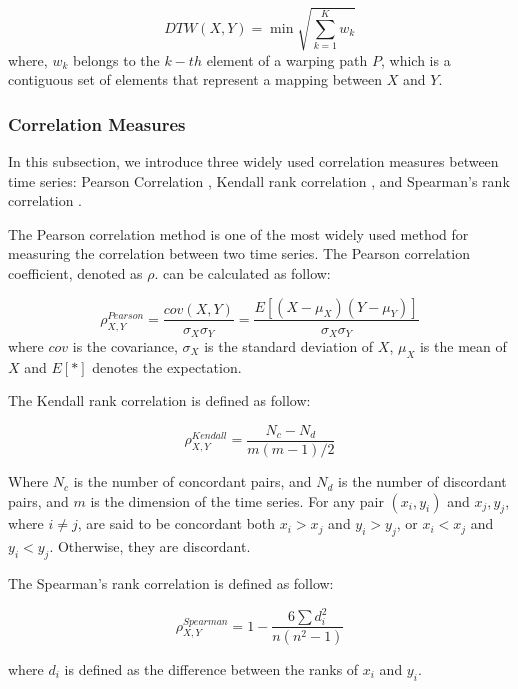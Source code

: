 \begin{equation}
DTW(X,Y) = \min { \sqrt{\sum_{k=1}^{K}w_k}}
\end{equation}
where, $w_k$ belongs to the $k-{th}$ element of a warping path $P$, which is a contiguous set of elements that represent a mapping between $X$ and $Y$.

\subsubsection{Correlation Measures}

In this subsection, we introduce three widely used correlation measures between time series: Pearson Correlation \cite{pearson1904mathematical}, Kendall rank correlation \cite{kendall1938new}, and Spearman's rank correlation \cite{pirie1988spearman}.

The Pearson correlation method is one of the most widely used method for measuring the correlation between two time series. The Pearson correlation coefficient, denoted as $\rho$. can be calculated as follow:

\begin{equation*}
\rho_{X,Y}^{Pearson}=\frac{cov(X,Y)}{\sigma_X\sigma_Y}=\frac{E[(X-\mu_X)(Y-\mu_Y)]}{\sigma_X\sigma_Y}
\end{equation*}
where $cov$ is the covariance, $\sigma_X$ is the standard deviation of $X$, $\mu_X$ is the mean of $X$ and $E[*]$ denotes the expectation.

The Kendall rank correlation \cite{kendall1938new} is defined as follow:

\begin{equation*}
\rho_{X,Y}^{Kendall}=\frac{N_c - N_d}{m(m-1)/2}
\end{equation*}

Where $N_c$ is the number of concordant pairs, and $N_d$ is the number of discordant pairs, and $m$ is the dimension of the time series.
For any pair $(x_i,y_i)$ and $x_j,y_j$, where $i \neq j$, are said to be concordant both $x_i > x_j$ and $y_i > y_j$, or $x_i < x_j$ and $y_i < y_j$. Otherwise, they are discordant.

The Spearman's rank correlation \cite{pirie1988spearman} is defined as follow:

\begin{equation*}
\rho_{X,Y}^{Spearman}=1 - \frac{6\sum d^2_i}{n(n^2-1)}
\end{equation*}

where $d_i$ is defined as the difference between the ranks of $x_i$ and $y_i$.

